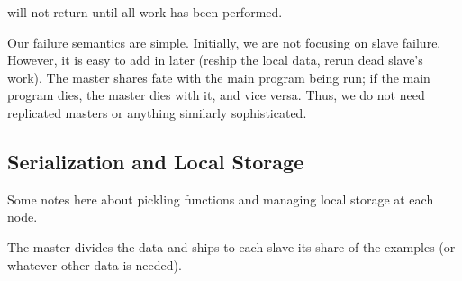 \documentclass[%
        final,
        notitlepage,
        narroweqnarray,
        inline,
        ]{ieee}
\begin{document}
will not return until all work has been performed.

Our failure semantics are simple. Initially, we are not focusing on slave
failure. However, it is easy to add in later (reship the local data, rerun dead
slave's work). The master shares fate with the main program being run; if the
main program dies, the master dies with it, and vice versa. Thus, we do not
need replicated masters or anything similarly sophisticated.

\subsection{Serialization and Local Storage}

Some notes here about pickling functions and managing local storage at each
node.

The master divides the data and ships to each slave its share of the examples
(or whatever other data is needed).

%
%

%
%
%
%
%
%
%
%
%
%
%
%
%
%
%
%
\end{document}
